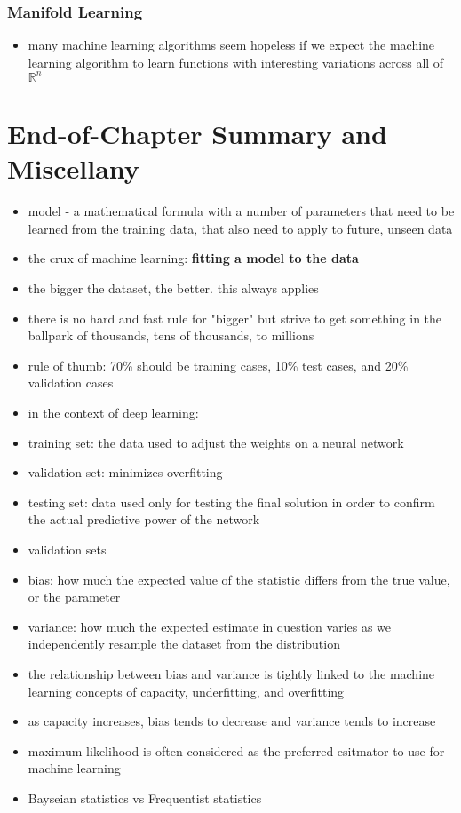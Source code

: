 \documentclass[11pt, twocolumn]{report}
\def\realnumbers{\mathbb{R}}
\begin{document}
\subsubsection{Manifold Learning}
\begin{itemize}
  \item many machine learning algorithms seem hopeless if we expect the machine
    learning algorithm to learn functions with interesting variations across
    all of $\realnumbers^n$
\end{itemize}

\section{End-of-Chapter Summary and Miscellany}
\begin{itemize}
  \item model - a mathematical formula with a number of parameters that need to
    be learned from the training data, that also need to apply to future,
    unseen data
  \item the crux of machine learning: \textbf{fitting a model to the data}
  \item the bigger the dataset, the better. this always applies
  \item there is no hard and fast rule for "bigger" but strive to get something
    in the ballpark of thousands, tens of thousands, to millions
  \item rule of thumb: 70\% should be training cases, 10\% test cases, and 20\%
    validation cases
  \item in the context of deep learning:
  \item training set: the data used to adjust the weights on a neural network
  \item validation set: minimizes overfitting
  \item testing set: data used only for testing the final solution in order to
    confirm the actual predictive power of the network
  \item validation sets
  \item bias: how much the expected value of the statistic differs from the
    true value, or the parameter
  \item variance: how much the expected estimate in question varies as
    we independently resample the dataset from the distribution
  \item the relationship between bias and variance is tightly linked to the
    machine learning concepts of capacity, underfitting, and overfitting
  \item as capacity increases, bias tends to decrease and variance tends to
    increase
  \item maximum likelihood is often considered as the preferred esitmator to
    use for machine learning
  \item Bayseian statistics vs Frequentist statistics
\end{itemize}
\end{document}

